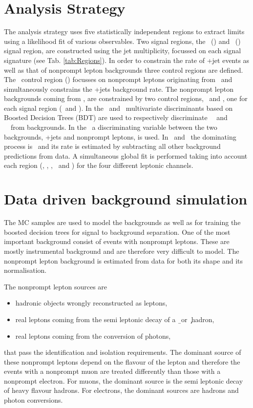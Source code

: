 \section{Analysis Strategy}
\label{sec:selection}


The analysis strategy uses five statistically independent regions to extract limits using a likelihood fit of various observables. Two signal regions, the \tZ\ (\STSR) and \tZq\ (\TTSR) signal region, are constructed using the jet multiplicity,  focussed on each signal signature (see Tab. \ref{tab:Regions}).  In order to constrain the rate of \WZ+jet events as well as that of nonprompt lepton backgrounds three control regions are defined. The \WZ\ control region (\WZCR) focusses on nonprompt leptons originating from \DY\ and simultaneously constrains the \WZ+jets background rate. The nonprompt lepton backgrounds coming from \ttbar, are constrained by two control regions, \TTCR\ and \STCR, one for each signal region (\TTSR\ and \STSR).  In the \STSR\ and \TTSR\, multivariate discriminants based on Boosted Decision Trees (BDT) are used to respectively discriminate \FCNC\ \tZ\ and \FCNC\ \tZq\ from backgrounds. In the \WZCR\ a  discriminating variable between the two backgrounds, \WZ+jets and nonprompt leptons, is used. In \TTCR\ and \STCR\, the dominating process is \ttbar\, and its rate is estimated by subtracting all other background predictions from data. A simultaneous global fit is performed taking into account each region (\STSR, \TTSR, \WZCR, \TTCR\ and \STCR) for the four different leptonic channels. 

\section{Data driven background simulation}
\label{sec:NPL}

The MC samples are used to model the backgrounds as well as for training the boosted decision trees
for signal to background separation. One of the most important background consist of events with nonprompt leptons. These are mostly instrumental background and are therefore very difficult to model. The nonprompt lepton background is estimated from data for both its shape and its normalisation. 

The nonprompt lepton sources are 
\begin{itemize}
	\item hadronic objects wrongly reconstructed as leptons, 
	\item real leptons coming from the semi leptonic decay of a \b\ or \c\ hadron,
	\item real leptons coming from the conversion of photons, 
\end{itemize}
that pass the identification and isolation requirements. The dominant source of these nonprompt leptons depend on the flavour of the lepton and therefore the events with a nonprompt muon are treated differently than those with a nonprompt electron. For muons, the dominant source is the semi leptonic decay of heavy flavour hadrons. For electrons, the dominant sources are hadrons and photon conversions. 

